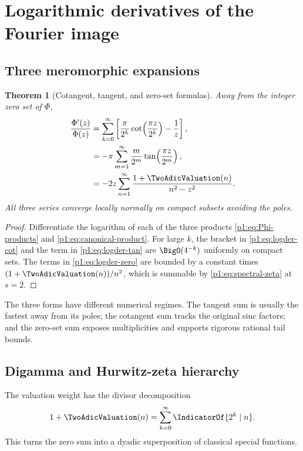 \documentclass[11pt]{article}
\newtheorem{theorem}{Theorem}[section]
\theoremstyle{definition}
\theoremstyle{remark}
\begin{document}
\section{Logarithmic derivatives of the Fourier image}

\subsection{Three meromorphic expansions}

\begin{theorem}[Cotangent, tangent, and zero-set formulas]\label{p1:thm:three-logder}
Away from the integer zero set of \(\Phi\),
\begin{align}
 \frac{\Phi'(z)}{\Phi(z)}
 &=\sum_{k=0}^{\infty}
 \left[
 \frac{\pi}{2^k}\cot\!\left(\frac{\pi z}{2^k}\right)-\frac1z
 \right],                                                    \label{p1:eq:logder-cot}\\
 &=-\pi\sum_{m=1}^{\infty}\frac{m}{2^m}
 \tan\!\left(\frac{\pi z}{2^m}\right),                    \label{p1:eq:logder-tan}\\
 &=-2z\sum_{n=1}^{\infty}\frac{1+\TwoAdicValuation(n)}{n^2-z^2}.       \label{p1:eq:logder-zero}
\end{align}
All three series converge locally normally on compact subsets avoiding the poles.
\end{theorem}

\begin{proof}
Differentiate the logarithm of each of the three products
\eqref{p1:eq:Phi-products} and \eqref{p1:eq:canonical-product}.  For large \(k\), the bracket
in \eqref{p1:eq:logder-cot} and the term in \eqref{p1:eq:logder-tan} are \(\BigO(4^{-k})\)
uniformly on compact sets.  The terms in \eqref{p1:eq:logder-zero} are bounded by a constant
times \((1+\TwoAdicValuation(n))/n^2\), which is summable by \eqref{p1:eq:spectral-zeta} at \(s=2\).
\end{proof}

The three forms have different numerical regimes.  The tangent sum is usually the fastest
away from its poles; the cotangent sum tracks the original sinc factors; and the zero-set
sum exposes multiplicities and supports rigorous rational tail bounds.

\subsection{Digamma and Hurwitz-zeta hierarchy}

The valuation weight has the divisor decomposition
\begin{equation}
 1+\TwoAdicValuation(n)=\sum_{k=0}^{\infty}\IndicatorOf{2^k\mid n}.     \label{p1:eq:valuation-indicators}
\end{equation}
This turns the zero sum into a dyadic superposition of classical special functions.
\end{document}
